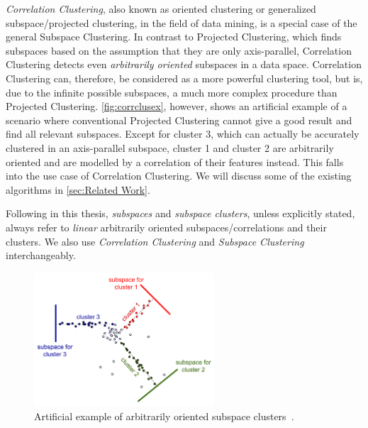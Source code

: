 \textit{Correlation Clustering}, also known as oriented clustering or generalized subspace/projected clustering, in the field of data mining, is a special case of the general Subspace Clustering. In contrast to Projected Clustering, which finds subspaces based on the assumption that they are only axis-parallel, Correlation Clustering detects even \textit{arbitrarily oriented} subspaces in a data space. Correlation Clustering can, therefore, be considered as a more powerful clustering tool, but is, due to the infinite possible subspaces, a much more complex procedure than Projected Clustering. \autoref{fig:corrclusex}, however, shows an artificial example of a scenario where conventional Projected Clustering cannot give a good result and find all relevant subspaces. Except for cluster 3, which can actually be accurately clustered in an axis-parallel subspace, cluster 1 and cluster 2 are arbitrarily oriented and are modelled by a correlation of their features instead. This falls into the use case of Correlation Clustering. We will discuss some of the existing algorithms in \autoref{sec:Related Work}.


Following in this thesis, \textit{subspaces} and \textit{subspace clusters}, unless explicitly stated, always refer to \textit{linear} arbitrarily oriented subspaces/correlations and their clusters. We also use \textit{Correlation Clustering} and \textit{Subspace Clustering} interchangeably.
\begin{figure}
    \centering
    \includegraphics[width=0.6\textwidth]{figures/subcluex.png}
    \caption{Artificial example of arbitrarily oriented subspace clusters~\cite[Ch.3]{zimek2009correlation}.}
    \label{fig:corrclusex}
\end{figure}
